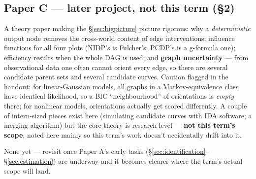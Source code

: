 \subsection{Paper C --- later project, not this term (\S2)}

A theory paper making the \S\ref{sec:bigpicture} picture rigorous: why a
\emph{deterministic} output node removes the cross-world content of edge
interventions; influence functions for all four plots (NIDP's is Fulcher's;
PCDP's is a g-formula one); efficiency results when the whole DAG is used;
and \textbf{graph uncertainty} --- from observational data one often cannot
orient every edge, so there are several candidate parent sets and several
candidate curves. Caution flagged in the handout: for linear-Gaussian
models, all graphs in a Markov-equivalence class have identical likelihood,
so a BIC ``neighbourhood'' of orientations is \emph{empty} there; for
nonlinear models, orientations actually get scored differently. A couple of
intern-sized pieces exist here (simulating candidate curves with IDA
software; a merging algorithm) but the core theory is research-level ---
\textbf{not this term's scope}, noted here mainly so this term's work
doesn't accidentally drift into it.

\begin{openquestions}
  \item None yet --- revisit once Paper A's early tasks
    (\S\ref{sec:identification}--\S\ref{sec:estimation}) are underway and it
    becomes clearer where the term's actual scope will land.
\end{openquestions}
